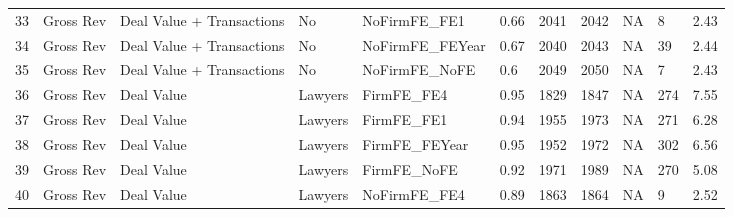 \documentclass{article}
\begin{document}
\begin{table}[H]
\begin{tabular}{rllllllllll}
  33 & Gross Rev & Deal Value + Transactions & No & NoFirmFE\_FE1 & 0.66 & 2041 & 2042 & NA & 8 & 2.43 \\ 
  34 & Gross Rev & Deal Value + Transactions & No & NoFirmFE\_FEYear & 0.67 & 2040 & 2043 & NA & 39 & 2.44 \\ 
  35 & Gross Rev & Deal Value + Transactions & No & NoFirmFE\_NoFE & 0.6 & 2049 & 2050 & NA & 7 & 2.43 \\ 
  36 & Gross Rev & Deal Value & Lawyers & FirmFE\_FE4 & 0.95 & 1829 & 1847 & NA & 274 & 7.55 \\ 
  37 & Gross Rev & Deal Value & Lawyers & FirmFE\_FE1 & 0.94 & 1955 & 1973 & NA & 271 & 6.28 \\ 
  38 & Gross Rev & Deal Value & Lawyers & FirmFE\_FEYear & 0.95 & 1952 & 1972 & NA & 302 & 6.56 \\ 
  39 & Gross Rev & Deal Value & Lawyers & FirmFE\_NoFE & 0.92 & 1971 & 1989 & NA & 270 & 5.08 \\ 
  40 & Gross Rev & Deal Value & Lawyers & NoFirmFE\_FE4 & 0.89 & 1863 & 1864 & NA & 9 & 2.52 \\ 
   \hline
\end{tabular}
\end{table}
\end{document}
